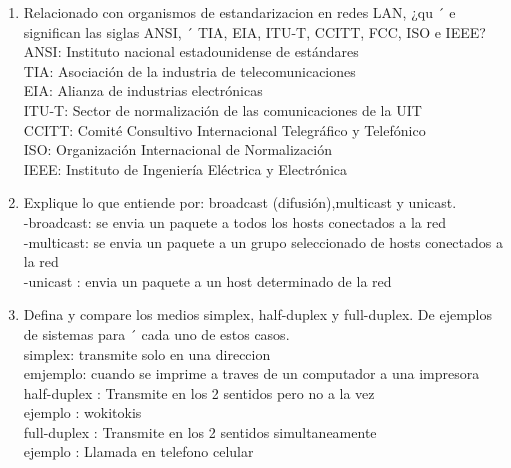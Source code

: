 \documentclass{udparticle}
\begin{document}
\begin{enumerate}
\item Relacionado con organismos de estandarizacion en redes LAN, ¿qu ´ e significan las siglas ANSI, ´
TIA, EIA, ITU-T, CCITT, FCC, ISO e IEEE?\\

    ANSI: Instituto nacional estadounidense de estándares\\
    TIA: Asociación de la industria de telecomunicaciones\\
    EIA: Alianza de industrias electrónicas\\
    ITU-T: Sector de normalización de las comunicaciones de la UIT\\
    CCITT: Comité Consultivo Internacional Telegráfico y Telefónico\\
    ISO: Organización Internacional de Normalización\\
    IEEE: Instituto de Ingeniería Eléctrica y Electrónica\\

\item Explique lo que entiende por: broadcast (difusión),multicast y unicast.\\
    -broadcast: se envia un paquete a todos los hosts conectados a la red\\
    -multicast: se envia un paquete a un grupo seleccionado de hosts conectados a la red\\
    -unicast : envia un paquete a un host determinado de la red\\
\item Defina y compare los medios simplex, half-duplex y full-duplex. De ejemplos de sistemas para ´
cada uno de estos casos.\\
    simplex: transmite solo en una direccion \\
        emjemplo: cuando se imprime a traves de un computador a una impresora\\
    half-duplex : Transmite en los 2 sentidos pero no a la vez \\
        ejemplo : wokitokis\\
    full-duplex : Transmite en los 2 sentidos simultaneamente\\
        ejemplo : Llamada en telefono celular\\
        

\end{enumerate}
\end{document}
